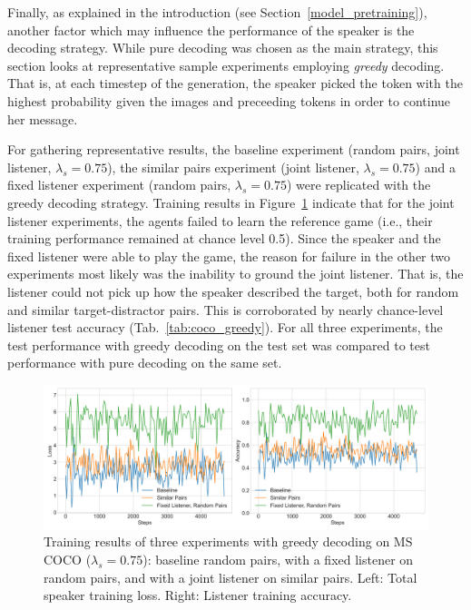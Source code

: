 Finally, as explained in the introduction (see Section~\ref{model_pretraining}), another factor which may influence the performance of the speaker is the decoding strategy. While pure decoding was chosen as the main strategy, this section looks at representative sample experiments employing \emph{greedy} decoding. That is, at each timestep of the generation, the speaker picked the token with the highest probability given the images and preceeding tokens in order to continue her message. 

For gathering representative results, the baseline experiment (random pairs, joint listener, $\lambda_s=0.75$), the similar pairs experiment (joint listener, $\lambda_s=0.75$) and a fixed listener experiment (random pairs, $\lambda_s=0.75$) were replicated with the greedy decoding strategy. Training results in Figure~\ref{fig:coco_greedy_baseline} indicate that for the joint listener experiments, the agents failed to learn the reference game (i.e., their training performance remained at chance level 0.5). Since the speaker and the fixed listener were able to play the game, the reason for failure in the other two experiments most likely was the inability to ground the joint listener. That is, the listener could not pick up how the speaker described the target, both for random and similar target-distractor pairs. This is corroborated by nearly chance-level listener test accuracy (Tab.~\ref{tab:coco_greedy}). For all three experiments, the test performance with greedy decoding on the test set was compared to test performance with pure decoding on the same set. 
\begin{figure}[h]
	\centering
	\includegraphics[width=\linewidth]{images/coco_greedy_all_075_losses.png}
	\caption{Training results of three experiments with greedy decoding on MS COCO ($\lambda_s = 0.75$): baseline random pairs, with a fixed listener on random pairs, and with a joint listener on similar pairs. Left: Total speaker training loss. Right: Listener training accuracy.}
	\label{fig:coco_greedy_baseline}
\end{figure} 
